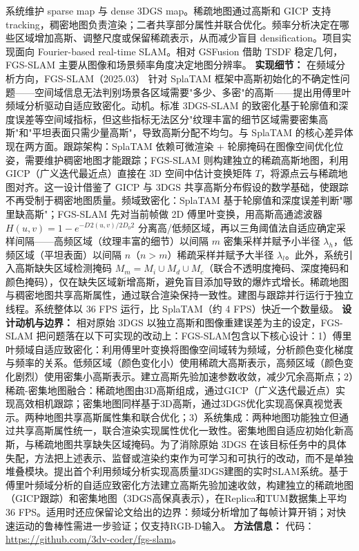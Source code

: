 系统维护 sparse map 与 dense 3DGS map。稀疏地图通过高斯和 GICP 支持 tracking，稠密地图负责渲染；二者共享部分属性并联合优化。频率分析决定在哪些区域增加高斯、调整尺度或保留稀疏表示，从而减少盲目 densification。项目实现面向 Fourier-based real-time SLAM。相对 GSFusion 借助 TSDF 稳定几何，FGS-SLAM 主要从图像和场景频率角度决定地图分辨率。
\textbf{实现细节：} 在频域分析方向，FGS-SLAM（2025.03） 针对 SplaTAM 框架中高斯初始化的不确定性问题——空间域信息无法判别场景各区域需要"多少、多密"的高斯——提出用傅里叶频域分析驱动自适应致密化。动机。标准 3DGS-SLAM 的致密化基于轮廓值和深度误差等空间域指标，但这些指标无法区分"纹理丰富的细节区域需要密集高斯"和"平坦表面只需少量高斯"，导致高斯分配不均匀。与 SplaTAM 的核心差异体现在两方面。跟踪架构：SplaTAM 依赖可微渲染 + 轮廓掩码在图像空间优化位姿，需要维护稠密地图才能跟踪；FGS-SLAM 则构建独立的稀疏高斯地图，利用 GICP（广义迭代最近点）直接在 3D 空间中估计变换矩阵 $T$，将源点云与稀疏地图对齐。这一设计借鉴了 GICP 与 3DGS 共享高斯分布假设的数学基础，使跟踪不再受制于稠密地图质量。频域致密化：SplaTAM 基于轮廓值和深度误差判断"哪里缺高斯"；FGS-SLAM 先对当前帧做 2D 傅里叶变换，用高斯高通滤波器 $H(u,v) = 1 - e^{-D^{}2(u,v)/2D_0^{}2}$ 分离高/低频区域，再以三角阈值法自适应确定采样间隔——高频区域（纹理丰富的细节）以间隔 $m$ 密集采样并赋予小半径 $\lambda_h$，低频区域（平坦表面）以间隔 $n$（$n > m$）稀疏采样并赋予大半径 $\lambda_l$。此外，系统引入高斯缺失区域检测掩码 $M_m = M_i \cup M_d \cup M_c$（联合不透明度掩码、深度掩码和颜色掩码），仅在缺失区域新增高斯，避免盲目添加导致的爆炸式增长。稀疏地图与稠密地图共享高斯属性，通过联合渲染保持一致性。建图与跟踪并行运行于独立线程。系统整体以 36 FPS 运行，比 SplaTAM（约 4 FPS）快近一个数量级。
\textbf{设计动机与边界：} 相对原始 3DGS 以独立高斯和图像重建误差为主的设定，FGS-SLAM 把问题落在以下可实现的改动上：FGS-SLAM包含以下核心设计：1）傅里叶频域自适应致密化：利用傅里叶变换将图像空间域转为频域，分析颜色变化梯度与频率的关系。低频区域（颜色变化小）使用稀疏大高斯表示，高频区域（颜色变化剧烈）使用密集小高斯表示。建立高斯先验加速参数收敛，减少冗余高斯点；2）稀疏-密集地图融合：稀疏地图由3D高斯组成，通过GICP（广义迭代最近点）实现高效相机跟踪；密集地图同样基于3D高斯，通过3DGS优化实现高保真视觉表示。两种地图共享高斯属性集和联合优化；3）系统集成：两种地图功能独立但通过共享高斯属性统一，联合渲染实现属性优化一致性。密集地图自适应初始化新高斯，与稀疏地图共享缺失区域掩码。为了消除原始 3DGS 在该目标任务中的具体失配，方法把上述表示、监督或渲染约束作为可学习和可执行的改动，而不是单独堆叠模块。提出首个利用频域分析实现高质量3DGS建图的实时SLAM系统。基于傅里叶频域分析的自适应致密化方法建立高斯先验加速收敛，构建独立的稀疏地图（GICP跟踪）和密集地图（3DGS高保真表示），在Replica和TUM数据集上平均36 FPS。适用时还应保留论文给出的边界：频域分析增加了每帧计算开销；对快速运动的鲁棒性需进一步验证；仅支持RGB-D输入。
\textbf{方法信息：} 代码：\url{https://github.com/3dv-coder/fgs-slam}。



